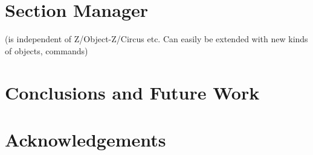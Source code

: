 \documentclass{llncs}
\begin{document}
\section{Section Manager}

  (is independent of Z/Object-Z/Circus etc.
  Can easily be extended with new kinds of objects, commands)

\section{Conclusions and Future Work} \label{sec:conclusions}

\section*{Acknowledgements}



\end{document}
